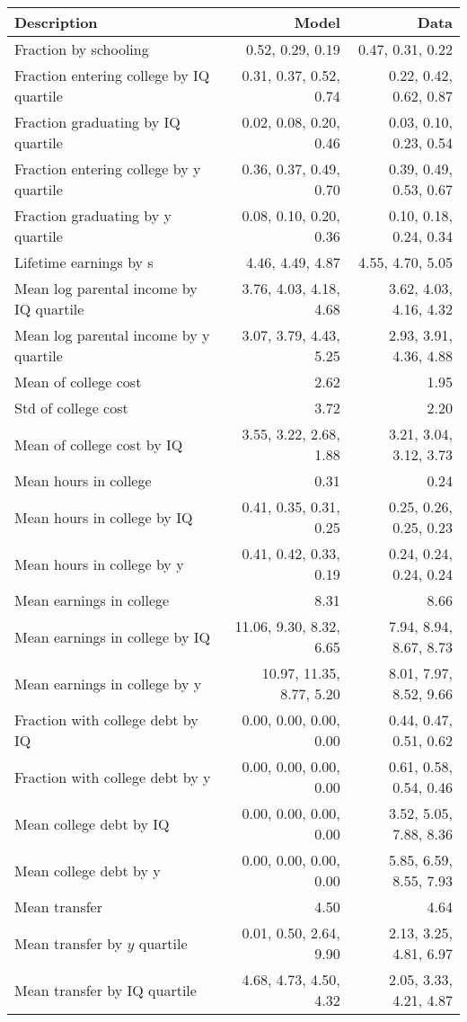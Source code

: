 \begin{tabular}{lrr}
\hline
Description & Model  & Data  \\
\hline
Fraction by schooling & 0.52, 0.29, 0.19  & 0.47, 0.31, 0.22  \\
Fraction entering college by IQ quartile & 0.31, 0.37, 0.52, 0.74  & 0.22, 0.42, 0.62, 0.87  \\
Fraction graduating by IQ quartile & 0.02, 0.08, 0.20, 0.46  & 0.03, 0.10, 0.23, 0.54  \\
Fraction entering college by y quartile & 0.36, 0.37, 0.49, 0.70  & 0.39, 0.49, 0.53, 0.67  \\
Fraction graduating by y quartile & 0.08, 0.10, 0.20, 0.36  & 0.10, 0.18, 0.24, 0.34  \\
Lifetime earnings by s & 4.46, 4.49, 4.87  & 4.55, 4.70, 5.05  \\
Mean log parental income by IQ quartile & 3.76, 4.03, 4.18, 4.68  & 3.62, 4.03, 4.16, 4.32  \\
Mean log parental income by y quartile & 3.07, 3.79, 4.43, 5.25  & 2.93, 3.91, 4.36, 4.88  \\
Mean of college cost & 2.62  & 1.95  \\
Std of college cost & 3.72  & 2.20  \\
Mean of college cost by IQ & 3.55, 3.22, 2.68, 1.88  & 3.21, 3.04, 3.12, 3.73  \\
Mean hours in college & 0.31  & 0.24  \\
Mean hours in college by IQ & 0.41, 0.35, 0.31, 0.25  & 0.25, 0.26, 0.25, 0.23  \\
Mean hours in college by y & 0.41, 0.42, 0.33, 0.19  & 0.24, 0.24, 0.24, 0.24  \\
Mean earnings in college & 8.31  & 8.66  \\
Mean earnings in college by IQ & 11.06, 9.30, 8.32, 6.65  & 7.94, 8.94, 8.67, 8.73  \\
Mean earnings in college by y & 10.97, 11.35, 8.77, 5.20  & 8.01, 7.97, 8.52, 9.66  \\
Fraction with college debt by IQ & 0.00, 0.00, 0.00, 0.00  & 0.44, 0.47, 0.51, 0.62  \\
Fraction with college debt by y & 0.00, 0.00, 0.00, 0.00  & 0.61, 0.58, 0.54, 0.46  \\
Mean college debt by IQ & 0.00, 0.00, 0.00, 0.00  & 3.52, 5.05, 7.88, 8.36  \\
Mean college debt by y & 0.00, 0.00, 0.00, 0.00  & 5.85, 6.59, 8.55, 7.93  \\
Mean transfer & 4.50  & 4.64  \\
Mean transfer by $y$ quartile & 0.01, 0.50, 2.64, 9.90  & 2.13, 3.25, 4.81, 6.97  \\
Mean transfer by IQ quartile & 4.68, 4.73, 4.50, 4.32  & 2.05, 3.33, 4.21, 4.87  \\
\hline
\end{tabular}%
